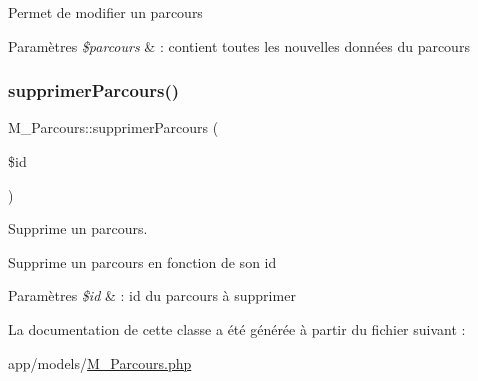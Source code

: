Permet de modifier un parcours 
\begin{DoxyParams}{Paramètres}
{\em \$parcours} & \+: contient toutes les nouvelles données du parcours \\
\hline
\end{DoxyParams}
\mbox{\label{class_m___parcours_a7ddb21f04f791c494ffa9b0762b7e6d2}} 
\subsubsection{\texorpdfstring{supprimer\+Parcours()}{supprimerParcours()}}
{\footnotesize\ttfamily M\+\_\+\+Parcours\+::supprimer\+Parcours (\begin{DoxyParamCaption}\item[{}]{\$id }\end{DoxyParamCaption})}



Supprime un parcours. 

Supprime un parcours en fonction de son id 
\begin{DoxyParams}{Paramètres}
{\em \$id} & \+: id du parcours à supprimer \\
\hline
\end{DoxyParams}


La documentation de cette classe a été générée à partir du fichier suivant \+:\begin{DoxyCompactItemize}
\item 
app/models/\hyperlink{_m___parcours_8php}{M\+\_\+\+Parcours.\+php}\end{DoxyCompactItemize}
